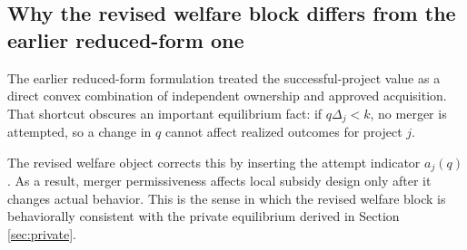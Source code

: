\subsection{Why the revised welfare block differs from the earlier reduced-form one}

The earlier reduced-form formulation treated the successful-project value as a direct convex combination of independent ownership and approved acquisition.
That shortcut obscures an important equilibrium fact:
if \(q\Delta_j<k\), no merger is attempted, so a change in \(q\) cannot affect realized outcomes for project \(j\).

The revised welfare object corrects this by inserting the attempt indicator \(a_j(q)\).
As a result, merger permissiveness affects local subsidy design only after it changes actual behavior.
This is the sense in which the revised welfare block is behaviorally consistent with the private equilibrium derived in Section \ref{sec:private}.
